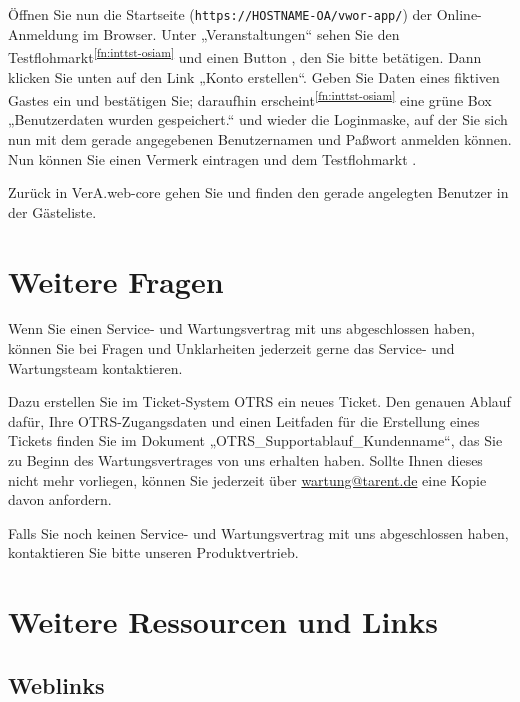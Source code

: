 Öffnen Sie nun die Startseite (\texttt{https://HOSTNAME-OA/vwor-app/})
der Online-Anmeldung im Browser. Unter „Veranstaltungen“ sehen Sie
den Testflohmarkt\Hair\textsuperscript{\ref{fn:inttst-osiam}} und
einen Button , den Sie bitte
betätigen. Dann klicken Sie unten auf den Link „Konto erstellen“.
Geben Sie Daten eines fiktiven Gastes ein und bestätigen Sie; daraufhin
erscheint\Hair\textsuperscript{\ref{fn:inttst-osiam}} eine grüne Box
„Benutzerdaten wurden gespeichert.“ und wieder die Loginmaske, auf der
Sie sich nun mit dem gerade angegebenen Benutzernamen und Paßwort
anmelden können. Nun können Sie einen Vermerk eintragen und dem
Testflohmarkt .

Zurück in VerA.web-core gehen Sie 
und finden den gerade angelegten Benutzer in der Gästeliste.

\fi%

\section{Weitere Fragen}\label{sec:outro}

Wenn Sie einen Service- und Wartungsvertrag mit uns abgeschlossen
haben, können Sie bei Fragen und Unklarheiten jederzeit gerne das
Service- und Wartungsteam kontaktieren.

Dazu erstellen Sie im Ticket-System OTRS ein neues Ticket. Den
genauen Ablauf dafür, Ihre OTRS-Zugangsdaten und einen Leitfaden
für die Erstellung eines Tickets finden Sie im Dokument
„OTRS\_Supportablauf\_Kundenname“, das Sie zu Beginn des
Wartungsvertrages von uns erhalten haben. Sollte Ihnen dieses
nicht mehr vorliegen, können Sie jederzeit über
\href{mailto:wartung@tarent.de}{wartung@tarent.de} eine Kopie
davon anfordern.

Falls Sie noch keinen Service- und Wartungsvertrag mit uns abgeschlossen
haben, kontaktieren Sie bitte unseren Produktvertrieb.

\section{Weitere Ressourcen und Links}\label{sec:links}

\subsection{Weblinks}\label{subsec:links-web}

